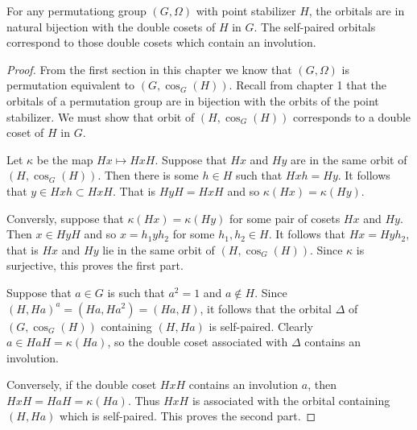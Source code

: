 \begin{proposition}[Lorimer]
For any permutationg group $(G,\Omega)$ with point stabilizer $H$, 
the orbitals are in natural bijection with the double cosets of $H$ in $G$.
The self-paired orbitals correspond to those 
double cosets which contain an involution.
\begin{proof}
From the first section in this chapter we know that $(G,\Omega)$
is permutation equivalent to $(G,\cos_G(H))$.
Recall from chapter 1 that the orbitals of a permutation group
are in bijection with the orbits of the point stabilizer.
We must show that orbit of $(H,\cos_G(H))$
corresponds to a double coset of $H$ in $G$.

Let $\kappa$ be the map $Hx \mapsto HxH$.
Suppose that $Hx$ and $Hy$ are in the same orbit
of $(H,\cos_G(H))$.
Then there is some $h \in H$ such that $Hxh = Hy$.
It follows that $y \in Hxh \subset HxH$.
That is $HyH = HxH$ and so $\kappa(Hx) = \kappa(Hy)$.

Conversly, suppose that $\kappa(Hx) = \kappa(Hy)$
for some pair of cosets $Hx$ and $Hy$.
Then $x \in HyH$ and so $x = h_1 y h_2$ for some 
$h_1, h_2 \in H$.
It follows that $Hx = Hyh_2$,
that is $Hx$ and $Hy$ lie in the same orbit of 
$(H,\cos_G(H))$.
Since $\kappa$ is surjective,
this proves the first part. 

Suppose that $a \in G$ is such that $a^2 = 1$ and $a \not\in H$.
Since $(H, Ha)^a = (Ha, Ha^2) = (Ha, H)$, it follows that 
the orbital $\Delta$ of $(G,\cos_G(H))$ 
containing $(H,Ha)$ is self-paired.
Clearly $a \in HaH = \kappa(Ha)$,
so the double coset associated with $\Delta$ contains an involution.

Conversely, if the double coset $HxH$ contains 
an involution $a$, then $HxH = HaH = \kappa(Ha)$.
Thus $HxH$ is associated with the orbital containing
$(H,Ha)$ which is self-paired.
This proves the second part.
\end{proof}
\end{proposition}

